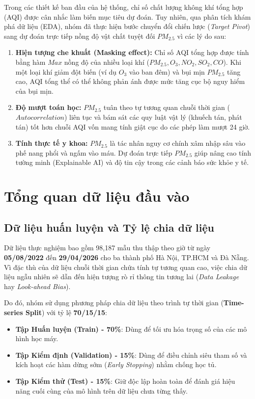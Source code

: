 \documentclass[12pt,a4paper]{article}
\begin{document}
Trong các thiết kế ban đầu của hệ thống, chỉ số chất lượng không khí tổng hợp (AQI) được cân nhắc làm biến mục tiêu dự đoán. Tuy nhiên, qua phân tích khám phá dữ liệu (EDA), nhóm đã thực hiện bước chuyển đổi chiến lược (\textit{Target Pivot}) sang dự đoán trực tiếp nồng độ vật chất tuyệt đối $PM_{2.5}$ vì các lý do sau:
\begin{enumerate}
    \item \textbf{Hiện tượng che khuất (Masking effect):} Chỉ số AQI tổng hợp được tính bằng hàm $Max$ nồng độ của nhiều loại khí ($PM_{2.5}, O_3, NO_2, SO_2, CO$). Khi một loại khí giảm đột biến (ví dụ $O_3$ vào ban đêm) và bụi mịn $PM_{2.5}$ tăng cao, AQI tổng thể có thể không phản ánh được mức tăng cục bộ nguy hiểm của bụi mịn.
    \item \textbf{Độ mượt toán học:} $PM_{2.5}$ tuân theo tự tương quan chuỗi thời gian ($Autocorrelation$) liên tục và bám sát các quy luật vật lý (khuếch tán, phát tán) tốt hơn chuỗi AQI vốn mang tính giật cục do các phép làm mượt 24 giờ.
    \item \textbf{Tính thực tế y khoa:} $PM_{2.5}$ là tác nhân nguy cơ chính xâm nhập sâu vào phế nang phổi và ngấm vào máu. Dự đoán trực tiếp $PM_{2.5}$ giúp nâng cao tính tường minh (Explainable AI) và độ tin cậy trong các cảnh báo sức khỏe y tế.
\end{enumerate}

\section{Tổng quan dữ liệu đầu vào}

\subsection{Dữ liệu huấn luyện và Tỷ lệ chia dữ liệu}

Dữ liệu thực nghiệm bao gồm 98,187 mẫu thu thập theo giờ từ ngày \textbf{05/08/2022} đến \textbf{29/04/2026} cho ba thành phố Hà Nội, TP.HCM và Đà Nẵng. Vì đặc thù của dữ liệu chuỗi thời gian chứa tính tự tương quan cao, việc chia dữ liệu ngẫu nhiên sẽ dẫn đến hiện tượng rò rỉ thông tin tương lai (\textit{Data Leakage} hay \textit{Look-ahead Bias}). 

Do đó, nhóm sử dụng phương pháp chia dữ liệu theo trình tự thời gian (\textbf{Time-series Split}) với tỷ lệ \textbf{70/15/15}:
\begin{itemize}
    \item \textbf{Tập Huấn luyện (Train) - 70\%}: Dùng để tối ưu hóa trọng số của các mô hình học máy.
    \item \textbf{Tập Kiểm định (Validation) - 15\%}: Dùng để điều chỉnh siêu tham số và kích hoạt các hàm dừng sớm (\textit{Early Stopping}) nhằm chống học tủ.
    \item \textbf{Tập Kiểm thử (Test) - 15\%}: Giữ độc lập hoàn toàn để đánh giá hiệu năng cuối cùng của mô hình trên dữ liệu chưa từng thấy.
\end{itemize}
\end{document}
